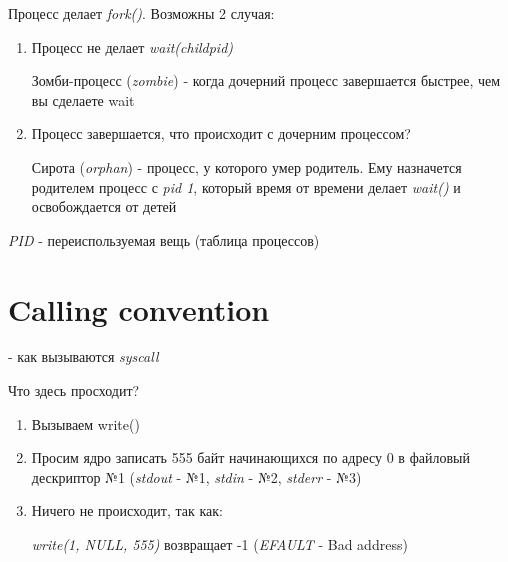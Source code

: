 \documentclass[../lectures.tex]{subfiles}
\begin{document}
Процесс делает \emph{fork()}. Возможны 2 случая:
\begin{enumerate}
    \item 
        Процесс не делает \emph{wait(childpid)}

        Зомби-процесс (\emph{zombie}) - когда дочерний процесс завершается быстрее, чем вы сделаете wait
    \item 
        Процесс завершается, что происходит с дочерним процессом?

        Сирота (\emph{orphan}) - процесс, у которого умер родитель. Ему назначется родителем процесс с \emph{pid 1}, который время от времени делает \emph{wait()} и освобождается от детей
\end{enumerate}
\emph{PID} - переиспользуемая вещь (таблица процессов)

\section{Calling convention}
 - как вызываются \emph{syscall}


Что здесь просходит?
\begin{enumerate}
    \item Вызываем write()
    \item Просим ядро записать 555 байт начинающихся по адресу 0 в файловый дескриптор №1 (\emph{stdout} - №1, \emph{stdin} - №2, \emph{stderr} - №3)
    \item 
        Ничего не происходит, так как:

        \emph{write(1, NULL, 555)} возвращает -1 (\emph{EFAULT} - Bad address)
\end{enumerate}
\end{document}
